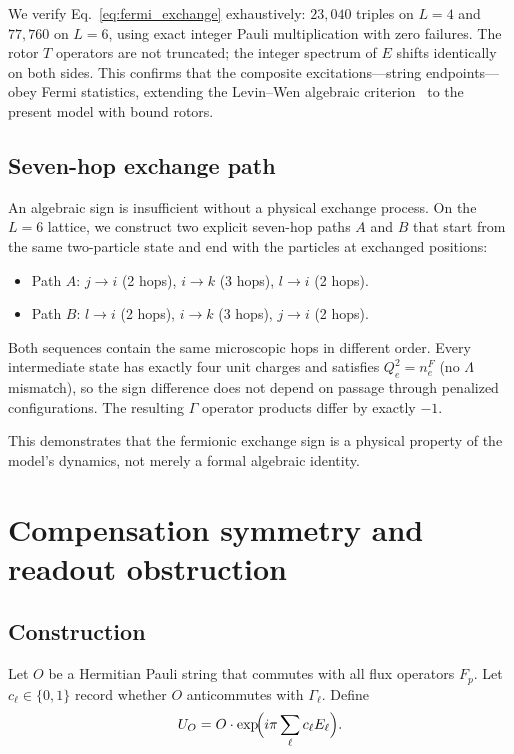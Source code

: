 \documentclass[aps,prb,twocolumn,superscriptaddress,showpacs]{revtex4-2}
\begin{document}
We verify Eq.~\eqref{eq:fermi_exchange} exhaustively: $23{,}040$ triples on
$L=4$ and $77{,}760$ on $L=6$, using exact integer Pauli multiplication
with zero failures. The rotor $T$ operators are not truncated; the integer
spectrum of $E$ shifts identically on both sides. This confirms that the
composite excitations---string endpoints---obey Fermi statistics, extending
the Levin--Wen algebraic criterion~\cite{levin2003} to the present model
with bound rotors.

\subsection{Seven-hop exchange path}

An algebraic sign is insufficient without a physical exchange process. On
the $L=6$ lattice, we construct two explicit seven-hop paths $A$ and $B$
that start from the same two-particle state and end with the particles
at exchanged positions:
\begin{itemize}
\item Path $A$: $j\to i$ (2 hops), $i\to k$ (3 hops), $l\to i$ (2 hops).
\item Path $B$: $l\to i$ (2 hops), $i\to k$ (3 hops), $j\to i$ (2 hops).
\end{itemize}
Both sequences contain the same microscopic hops in different order. Every
intermediate state has exactly four unit charges and satisfies $Q_e^2=n_e^F$
(no $\Lambda$ mismatch), so the sign difference does not depend on
passage through penalized configurations. The resulting $\Gamma$ operator
products differ by exactly $-1$.

This demonstrates that the fermionic exchange sign is a physical property
of the model's dynamics, not merely a formal algebraic identity.

\section{Compensation symmetry and readout obstruction}
\label{sec:readout}

\subsection{Construction}

Let $O$ be a Hermitian Pauli string that commutes with all flux operators
$F_p$. Let $c_\ell\in\{0,1\}$ record whether $O$ anticommutes with
$\Gamma_\ell$. Define
\begin{equation}
U_O = O\cdot\exp\!\Bigl(i\pi\sum_\ell c_\ell E_\ell\Bigr).
\label{eq:compensation}
\end{equation}
\end{document}

